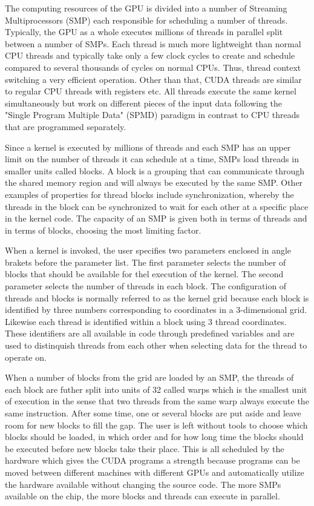 The computing resources of the GPU is divided into a number of Streaming Multiprocessors (SMP) each responsible for scheduling a number of threads. Typically, the GPU as a whole executes millions of threads in parallel split between a number of SMPs. Each thread is much more lightweight than normal CPU threads and typically take only a few clock cycles to create and schedule compared to several thousands of cycles on normal CPUs. Thus, thread context switching a very efficient operation. Other than that, CUDA threads are similar to regular CPU threads with registers etc. All threads execute the same kernel simultaneously but work on different pieces of the input data following the "Single Program Multiple Data" (SPMD) paradigm in contrast to CPU threads that are programmed separately. 

Since a kernel is executed by millions of threads and each SMP has an upper limit on the number of threads it can schedule at a time, SMPs load threads in smaller units called blocks. A block is a grouping that can communicate through the shared memory region and will always be executed by the same SMP. Other examples of properties for thread blocks include synchronization, whereby the threads in the block can be synchronized to wait for each other at a specific place in the kernel code. The capacity of an SMP is given both in terms of threads and in terms of blocks, choosing the most limiting factor.

When a kernel is invoked, the user specifies two parameters enclosed in angle brakets before the parameter list. The first parameter selects the number of blocks that should be available for thel execution of the kernel. The second parameter selects the number of threads in each block. The configuration of threads and blocks is normally referred to as the kernel grid because each block is identified by three numbers corresponding to coordinates in a 3-dimensional grid. Likewise each thread is identified within a block using 3 thread coordinates. These identifiers are all available in code through predefined variables and are used to distinquish threads from each other when selecting data for the thread to operate on.

When a number of blocks from the grid are loaded by an SMP, the threads of each block are futher split into units of 32 called warps which is the smallest unit of execution in the sense that two threads from the same warp always execute the same instruction. After some time, one or several blocks are put aside and leave room for new blocks to fill the gap. The user is left without tools to choose which blocks should be loaded, in which order and for how long time the blocks should be executed before new blocks take their place. This is all scheduled by the hardware which gives the CUDA programs a strength because programs can be moved between different machines with different GPUs and automatically utilize the hardware available without changing the source code. The more SMPs available on the chip, the more blocks and threads can execute in parallel.



